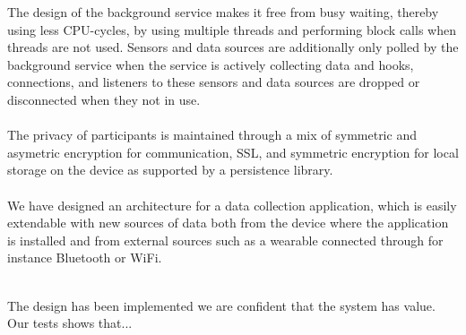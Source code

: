 The design of the background service makes it free from busy waiting, thereby using less CPU-cycles, by using multiple threads and performing block calls when threads are not used. Sensors and data sources are additionally only polled by the background service when the service is actively collecting data and hooks, connections, and listeners to these sensors and data sources are dropped or disconnected when they not in use.  
\\\\
The privacy of participants is maintained through a mix of symmetric and asymetric encryption for communication, SSL, and symmetric encryption for local storage on the device as supported by a persistence library. 
\\\\
We have designed an architecture for a data collection application, which is easily extendable with new sources of data both from the device where the application is installed and from external sources such as a wearable connected through for instance Bluetooth or WiFi.
\\\\



The design has been implemented we are confident that the system has value. Our tests shows that... 


